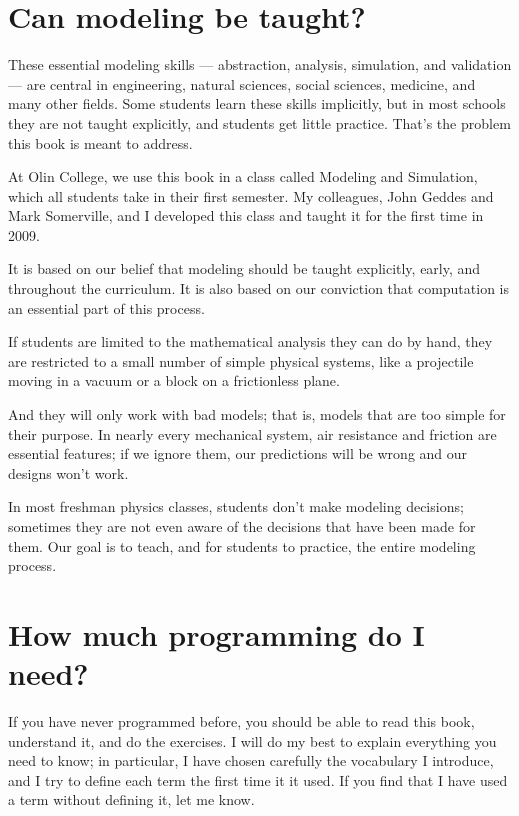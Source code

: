 \documentclass[12pt]{book}
\theoremstyle{exercise}
\begin{document}
\section{Can modeling be taught?}

These essential modeling skills --- abstraction, analysis, simulation, and validation --- are central in engineering, natural sciences, social sciences, medicine, and many other fields.  Some students learn these skills implicitly, but in most schools they are not taught explicitly, and students get little practice.  That's the problem this book is meant to address.  

At Olin College, we use this book in a class called Modeling and Simulation, which all students take in their first semester.  My colleagues, John Geddes and Mark Somerville, and I developed this class and taught it for the first time in 2009.

It is based on our belief that modeling should be taught explicitly, early, and throughout the curriculum.  It is also based on our conviction that computation is an essential part of this process.

If students are limited to the mathematical analysis they can do by hand, they are restricted to a small number of simple physical systems, like a projectile moving in a vacuum or a block on a frictionless plane.

And they will only work with bad models; that is, models that are too simple for their purpose.  In nearly every mechanical system, air resistance and friction are essential features; if we ignore them, our predictions will be wrong and our designs won't work.

In most freshman physics classes, students don't make modeling decisions; sometimes they are not even aware of the decisions that have been made for them.  Our goal is to teach, and for students to practice, the entire modeling process.


\section{How much programming do I need?}

If you have never programmed before, you should be able to read this book, understand it, and do the exercises.  I will do my best to explain everything you need to know; in particular, I have chosen carefully the vocabulary I introduce, and I try to define each term the first time it it used.  If you find that I have used a term without defining it, let me know.
\end{document}
